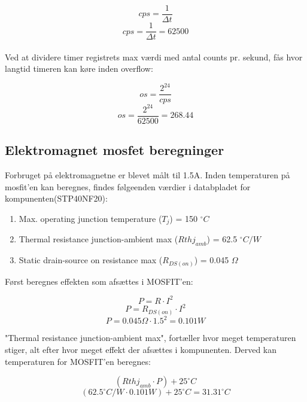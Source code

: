$$cps = \frac{1}{\Delta t}$$
$$cps = \frac{1}{\Delta t} = 62500$$\\

Ved at dividere timer registrets max værdi med antal counts pr. sekund, fås hvor langtid timeren kan køre inden overflow:

$$os = \frac{2^{24}}{cps}$$
$$os = \frac{2^{24}}{62500} = 268.44$$



\newpage
\subsection{Elektromagnet mosfet beregninger}
\label{subsec:mosfet}
Forbruget på elektromagnetne er blevet målt til 1.5A. Inden temperaturen på mosfit'en kan beregnes, findes følgeenden værdier i databpladet for kompunenten(STP40NF20):
\begin{enumerate}
\item Max. operating junction temperature ($T_j$) = 150 $^\circ C$
\item Thermal resistance junction-ambient max ($Rthj_{amb}$) = 62.5 $^\circ C/W$
\item Static drain-source on resistance max ($R_{DS(on)}$) = 0.045 $\Omega$
\end{enumerate}
Først beregnes effekten som afsættes i MOSFIT'en:

$$P = R \cdot I^2$$
$$P = R_{DS(on)} \cdot I^2$$
$$P = 0.045 \Omega \cdot 1.5^2 = 0.101 W$$

"Thermal resistance junction-ambient max", fortæller hvor meget temperaturen stiger, alt efter hvor meget effekt der afsættes i kompunenten. Derved kan temperaturen for MOSFIT'en beregnes:

$$(Rthj_{amb} \cdot P) + 25^\circ C$$
$$(62.5^\circ C/W  \cdot 0.101 W) + 25^\circ C = 31.31 ^\circ C$$
